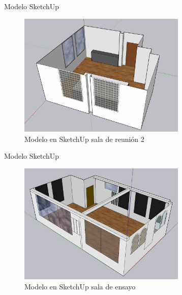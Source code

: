 \documentclass{sintefbeamer}
\begin{document}
\begin{frame}{Modelo SketchUp}
    \begin{figure}
        \centering
        \includegraphics[width=8cm]{images/Sketchup/Sala 2 Sketchup.png}
        \caption{Modelo en SketchUp sala de reunión 2}
        \label{fig:skp sala 2}
    \end{figure}
\end{frame}

\begin{frame}{Modelo SketchUp}
    \begin{figure}
        \centering
        \includegraphics[width=8cm]{images/Sketchup/Sala ensayo Sketchup.jpg}
        \caption{Modelo en SketchUp sala de ensayo}
        \label{fig:skp sala ensayo}
    \end{figure}
\end{frame}
\end{document}
